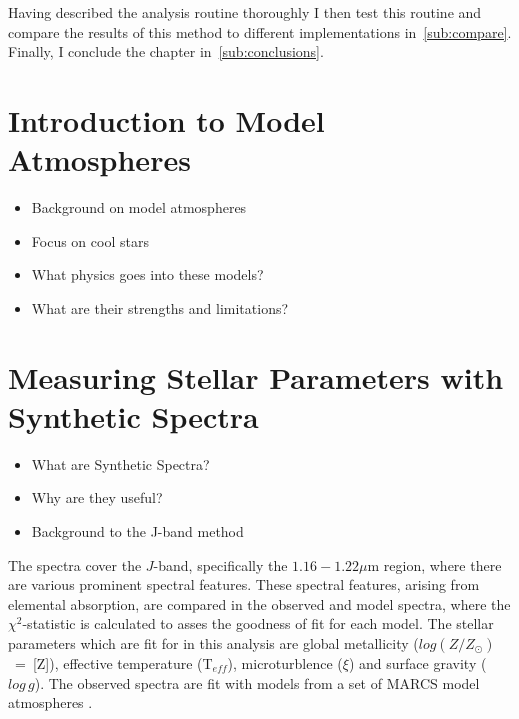 Having described the analysis routine thoroughly I then test this routine and compare the results of this method to different implementations in~\ref{sub:compare}.
Finally, I conclude the chapter in~\ref{sub:conclusions}.

\section{Introduction to Model Atmospheres} %
\label{sub:model_atmospheres}

\begin{itemize}
    \item Background on model atmospheres
    \item Focus on cool stars
    \item What physics goes into these models?
    \item What are their strengths and limitations?
\end{itemize}

\section{Measuring Stellar Parameters with Synthetic Spectra} %
\label{sub:model_grid}

\begin{itemize}
    \item What are Synthetic Spectra?
    \item Why are they useful?
    \item Background to the J-band method
\end{itemize}

The spectra cover the $J$-band, specifically the $1.16-1.22\mu$m region, where there are various prominent spectral features.
These spectral features, arising from elemental absorption, are compared in the observed and model spectra,
where the $\chi^{2}$-statistic is calculated to asses the goodness of fit for each model.
The stellar parameters which are fit for in this analysis are global metallicity ($log (Z/Z_{\odot})$~=~[Z]), effective temperature (T$_{eff}$), microturblence ($\xi$) and surface gravity ($log\,g$).
The observed spectra are fit with models from a set of MARCS model atmospheres
\citep{2008A&A...486..951G}.

